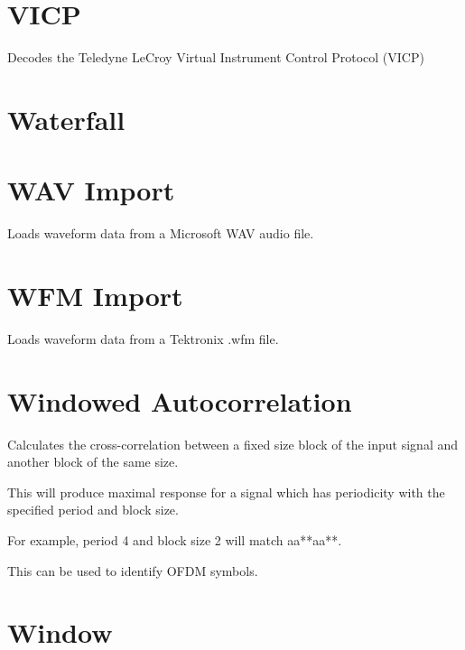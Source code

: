 \section{VICP}

Decodes the Teledyne LeCroy Virtual Instrument Control Protocol (VICP)

\pagebreak
\section{Waterfall}

\pagebreak
\section{WAV Import}

Loads waveform data from a Microsoft WAV audio file.

\pagebreak
\section{WFM Import}

Loads waveform data from a Tektronix .wfm file.

\pagebreak
\section{Windowed Autocorrelation}

Calculates the cross-correlation between a fixed size block of the input signal and another block of the same size.

This will produce maximal response for a signal which has periodicity with the specified period and block size.

For example, period 4 and block size 2 will match aa**aa**.

This can be used to identify OFDM symbols.

\pagebreak
\section{Window}

